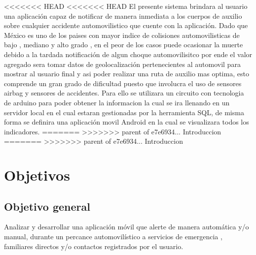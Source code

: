 <<<<<<< HEAD
<<<<<<< HEAD
El presente sistema brindara al usuario una aplicación capaz de notificar de manera inmediata a los cuerpos de auxilio sobre cualquier accidente automovilistico que cuente con la aplicación. Dado que México es uno de los paises con mayor indice de colisiones automovilisticas de bajo , mediano y alto grado , en el peor de los casos puede ocasionar la muerte  debido a la tardada notificación de algun choque automovilisitco por ende el valor agregado sera tomar datos de geolocalización pertenecientes al automovil para mostrar al usuario final  y asi poder realizar una ruta de auxilio mas optima, esto comprende un gran grado de dificultad puesto que involucra el uso de sensores airbag y sensores de accidentes. Para ello se utilizara un circuito con tecnologia de arduino para poder obtener la informacion la cual se ira llenando en un servidor local en el cual estaran gestionadas por la herramienta SQL, de misma forma se definira una aplicación movil Android en la cual se visualizara todos los indicadores.
=======
>>>>>>> parent of e7e6934... Introduccion
=======
>>>>>>> parent of e7e6934... Introduccion
 

\section{Objetivos}
\subsection{Objetivo general}
Analizar y desarrollar una aplicación móvil que alerte de manera automática y/o manual, durante un percance automovilístico a servicios de emergencia , familiares directos y/o contactos registrados por el usuario.
